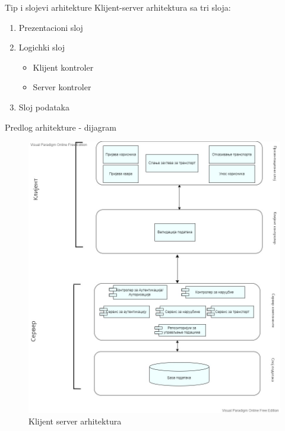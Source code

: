 \documentclass[11pt]{beamer}
\begin{document}
\begin{frame}{Tip i slojevi arhitekture}
Klijent-server arhitektura sa tri sloja:
\begin{enumerate}
    \item Prezentacioni sloj
    \item Logichki sloj
    \begin{itemize}
        \item Klijent kontroler
        \item Server kontroler
    \end{itemize}
    \item Sloj podataka
\end{enumerate}
 \end{frame}
\begin{frame}{Predlog arhitekture - dijagram}
    \begin{figure}
        \centering
        \includegraphics[scale=0.20]{Slike/Arhitektura/predlogArhitekture.jpg}
        \caption{Klijent server arhitektura}
        \label{fig:ksa}
    \end{figure}
 \end{frame}
\end{document}

